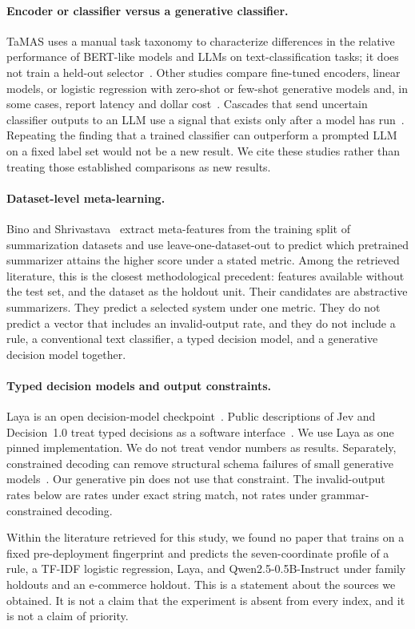 \paragraph{Encoder or classifier versus a generative classifier.}
TaMAS uses a manual task taxonomy to characterize differences in the relative performance of BERT-like models and LLMs on text-classification tasks; it does not train a held-out selector~\citep{zhang2025tamas}. Other studies compare fine-tuned encoders, linear models, or logistic regression with zero-shot or few-shot generative models and, in some cases, report latency and dollar cost~\citep{bucher2024,edwards2024,vajjala2025,gonzalez2026}. Cascades that send uncertain classifier outputs to an LLM use a signal that exists only after a model has run~\citep{deandrade2024,abedini2025,kondadadi2026}. Repeating the finding that a trained classifier can outperform a prompted LLM on a fixed label set would not be a new result. We cite these studies rather than treating those established comparisons as new results.

\paragraph{Dataset-level meta-learning.}
Bino and Shrivastava~\citeyearpar{bino2026} extract meta-features from the training split of summarization datasets and use leave-one-dataset-out to predict which pretrained summarizer attains the higher score under a stated metric. Among the retrieved literature, this is the closest methodological precedent: features available without the test set, and the dataset as the holdout unit. Their candidates are abstractive summarizers. They predict a selected system under one metric. They do not predict a vector that includes an invalid-output rate, and they do not include a rule, a conventional text classifier, a typed decision model, and a generative decision model together.

\paragraph{Typed decision models and output constraints.}
Laya is an open decision-model checkpoint~\citep{laya2026}. Public descriptions of Jev and Decision~1.0 treat typed decisions as a software interface~\citep{liu2026decision,li2026jev}. We use Laya as one pinned implementation. We do not treat vendor numbers as results. Separately, constrained decoding can remove structural schema failures of small generative models~\citep{chavan2026}. Our generative pin does not use that constraint. The invalid-output rates below are rates under exact string match, not rates under grammar-constrained decoding.

Within the literature retrieved for this study, we found no paper that trains on a fixed pre-deployment fingerprint and predicts the seven-coordinate profile of a rule, a TF-IDF logistic regression, Laya, and Qwen2.5-0.5B-Instruct under family holdouts and an e-commerce holdout. This is a statement about the sources we obtained. It is not a claim that the experiment is absent from every index, and it is not a claim of priority.
